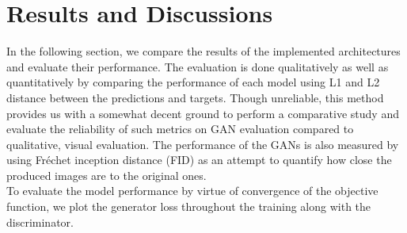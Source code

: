 \documentclass{article} %
\begin{document}
\section{Results and Discussions}
    \hspace*{0.167 in}In the following section, we compare the results of the implemented architectures and evaluate their performance. The evaluation is done qualitatively as well as quantitatively by comparing the performance of each model using L1 and L2 distance between the predictions and targets. Though unreliable, this method provides us with a somewhat decent ground to perform a comparative study and evaluate the reliability of such metrics on GAN evaluation compared to qualitative, visual evaluation. The performance of the GANs is also measured by using Fréchet inception distance (FID) as an attempt to quantify how close the produced images are to the original ones.\\
    \hspace*{0.167 in}To evaluate the model performance by virtue of convergence of the objective function, we plot the generator loss throughout the training along with the discriminator.\\
\end{document}
